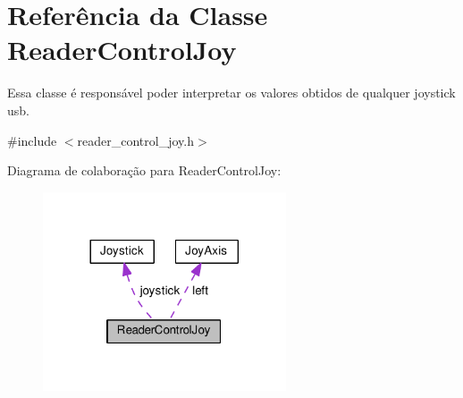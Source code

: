 \hypertarget{classReaderControlJoy}{}\section{Referência da Classe Reader\+Control\+Joy}
\label{classReaderControlJoy}


Essa classe é responsável poder interpretar os valores obtidos de qualquer joystick usb.  




{\ttfamily \#include $<$reader\+\_\+control\+\_\+joy.\+h$>$}



Diagrama de colaboração para Reader\+Control\+Joy\+:\nopagebreak
\begin{figure}[H]
\begin{center}
\leavevmode
\includegraphics[width=204pt]{classReaderControlJoy__coll__graph}
\end{center}
\end{figure}

